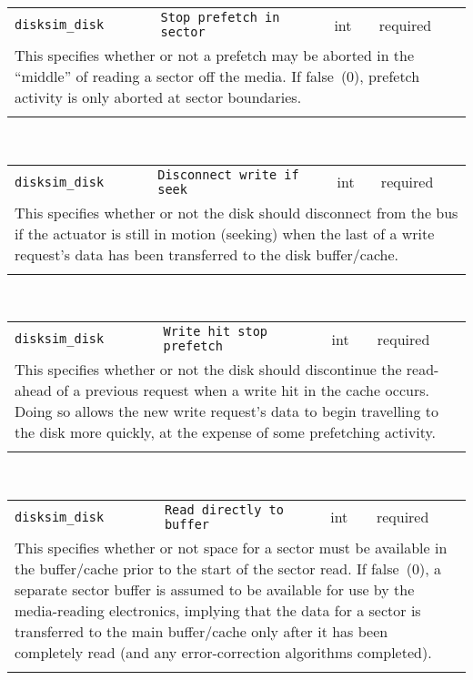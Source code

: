 \noindent 
\begin{tabular}{|p{1.5in}|p{3.5in}|p{0.5in}|p{0.5in}|}
\cline{1-4}
\texttt{disksim\_disk} & \texttt{Stop prefetch in sector} & int & required \\ 
\cline{1-4}
\multicolumn{4}{|p{6in}|}{
This specifies whether or not a prefetch may be aborted in the ``middle''
of reading a sector off the media. If false~(0), prefetch activity is
only aborted at sector boundaries.
}\\ 
\cline{1-4}
\multicolumn{4}{p{5in}}{}\\
\end{tabular}\\ 
\noindent 
\begin{tabular}{|p{1.5in}|p{3.5in}|p{0.5in}|p{0.5in}|}
\cline{1-4}
\texttt{disksim\_disk} & \texttt{Disconnect write if seek} & int & required \\ 
\cline{1-4}
\multicolumn{4}{|p{6in}|}{
This specifies whether or not the disk should disconnect from the bus if
the actuator is still in motion (seeking) when the last of a write
request's data has been transferred to the disk buffer/cache.
}\\ 
\cline{1-4}
\multicolumn{4}{p{5in}}{}\\
\end{tabular}\\ 
\noindent 
\begin{tabular}{|p{1.5in}|p{3.5in}|p{0.5in}|p{0.5in}|}
\cline{1-4}
\texttt{disksim\_disk} & \texttt{Write hit stop prefetch} & int & required \\ 
\cline{1-4}
\multicolumn{4}{|p{6in}|}{
This specifies whether or not
the disk should discontinue the read-ahead of a previous request when a
write hit in the cache occurs. Doing so allows the new write request's
data to begin travelling to the disk more quickly, at the expense of
some prefetching activity.
}\\ 
\cline{1-4}
\multicolumn{4}{p{5in}}{}\\
\end{tabular}\\ 
\noindent 
\begin{tabular}{|p{1.5in}|p{3.5in}|p{0.5in}|p{0.5in}|}
\cline{1-4}
\texttt{disksim\_disk} & \texttt{Read directly to buffer} & int & required \\ 
\cline{1-4}
\multicolumn{4}{|p{6in}|}{
This specifies whether or not
space for a sector must be available in the buffer/cache prior to the
start of the sector read. If false~(0), a separate sector buffer is assumed
to be available for use by the media-reading electronics, implying that the
data for a sector is transferred to the main buffer/cache only after it has
been completely read (and any error-correction algorithms completed).
}\\ 
\cline{1-4}
\multicolumn{4}{p{5in}}{}\\
\end{tabular}\\ 
